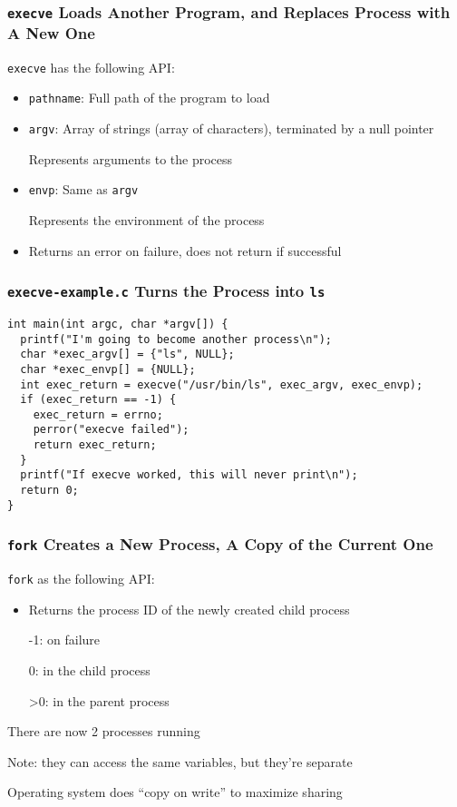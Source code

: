   \begin{frame}
    \frametitle{\texttt{execve} Loads Another Program, and Replaces Process with A New One}

    \texttt{execve} has the following API:
    \begin{itemize}
      \item \texttt{pathname}: Full path of the program to load
      \item \texttt{argv}: Array of strings (array of characters), terminated by a null pointer

            \hspace{2em} Represents arguments to the process
      \item \texttt{envp}: Same as \texttt{argv}

            \hspace{2em} Represents the environment of the process
      \item Returns an error on failure, does not return if successful
    \end{itemize}
  \end{frame}

  \begin{frame}[fragile]
    \frametitle{\texttt{execve-example.c} Turns the Process into \texttt{ls}}

    \begin{lstlisting}
int main(int argc, char *argv[]) {
  printf("I'm going to become another process\n");
  char *exec_argv[] = {"ls", NULL};
  char *exec_envp[] = {NULL};
  int exec_return = execve("/usr/bin/ls", exec_argv, exec_envp);
  if (exec_return == -1) {
    exec_return = errno;
    perror("execve failed");
    return exec_return;
  }
  printf("If execve worked, this will never print\n");
  return 0;
}
    \end{lstlisting}
  \end{frame}

  \begin{frame}
    \frametitle{\texttt{fork} Creates a New Process, A Copy of the Current One}

    \texttt{fork} as the following API:
    \begin{itemize}
      \item Returns the process ID of the newly created child process

            \hspace{2em} -1: on failure

            \hspace{2em} 0: in the child process

            \hspace{2em} >0: in the parent process
    \end{itemize}

    \vspace{2em}

    There are now 2 processes running

    \hspace{2em} Note: they can access the same variables, but they're separate

    \hspace{4em} Operating system does ``copy on write'' to maximize sharing
  \end{frame}

